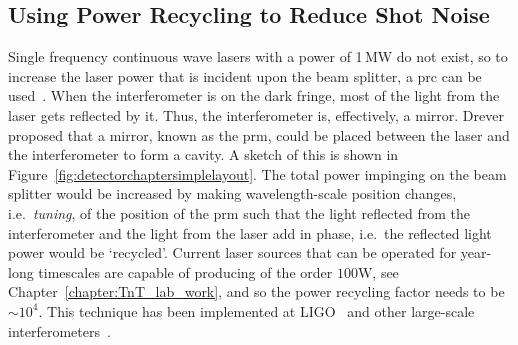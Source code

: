 \subsection{Using Power Recycling to Reduce Shot Noise}
Single frequency continuous wave lasers with a power of 1\,MW do not exist, so to increase the laser power that is incident upon the beam splitter, a \gls{prc} can be used~\cite{Meers1988,Strain1991,Schnier1997}. When the interferometer is on the dark fringe, most of the light from the laser gets reflected by it. Thus, the interferometer is, effectively, a mirror. Drever~\cite{Drever1983} proposed that a mirror, known as the \gls{prm}, could be placed between the laser and the interferometer to form a cavity. A sketch of this is shown in Figure~\ref{fig:detectorchaptersimplelayout}. The total power impinging on the beam splitter would be increased by making wavelength-scale position changes, i.e.~\emph{tuning}, of the position of the \gls{prm} such that the light reflected from the interferometer and the light from the laser add in phase, i.e.~the reflected light power would be `recycled'. Current laser sources that can be operated for year-long timescales are capable of producing of the order $100\si{\watt}$, see Chapter~\ref{chapter:TnT_lab_work}, and so the power recycling factor needs to be $\sim\!10^4$. This technique has been implemented at LIGO~\cite{Arain2008} and other large-scale interferometers~\cite{Acernese2014,Aso2013}.
